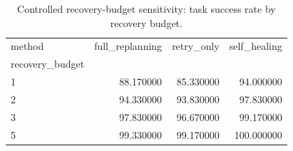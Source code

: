 \begin{table}
\caption{Controlled recovery-budget sensitivity: task success rate by recovery budget.}
\label{tab:controlled_budget_success}
\begin{tabular}{lrrr}
\toprule
method & full_replanning & retry_only & self_healing \\
recovery_budget &  &  &  \\
\midrule
1 & 88.170000 & 85.330000 & 94.000000 \\
2 & 94.330000 & 93.830000 & 97.830000 \\
3 & 97.830000 & 96.670000 & 99.170000 \\
5 & 99.330000 & 99.170000 & 100.000000 \\
\bottomrule
\end{tabular}
\end{table}
